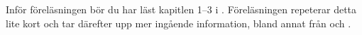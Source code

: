 Inför föreläsningen bör du har läst kapitlen 1--3 
i  \cite{Oetiker2011lshort}.
Föreläsningen repeterar detta lite kort och tar därefter upp mer ingående 
information, bland annat från  \cite{memdesign} och 
 \cite{memman}.
